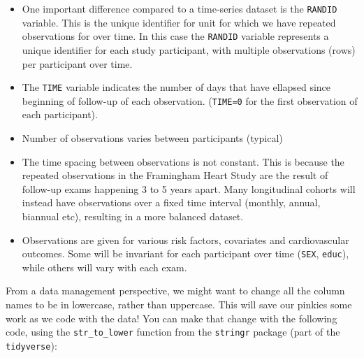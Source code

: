 \documentclass[
]{book}
\newenvironment{Shaded}{\begin{snugshade}}{\end{snugshade}}
\newcommand{\DataTypeTok}[1]{\textcolor[rgb]{0.13,0.29,0.53}{#1}}
\newcommand{\KeywordTok}[1]{\textcolor[rgb]{0.13,0.29,0.53}{\textbf{#1}}}
\newcommand{\NormalTok}[1]{#1}
\newcommand{\OperatorTok}[1]{\textcolor[rgb]{0.81,0.36,0.00}{\textbf{#1}}}
\newcommand{\StringTok}[1]{\textcolor[rgb]{0.31,0.60,0.02}{#1}}
\providecommand{\tightlist}{%
  \setlength{\itemsep}{0pt}\setlength{\parskip}{0pt}}
\begin{document}
\begin{itemize}
\tightlist
\item
  One important difference compared to a time-series dataset is the \texttt{RANDID} variable. This is the unique identifier for unit for which we have repeated observations for over time.
  In this case the \texttt{RANDID} variable represents a unique identifier for each study participant, with multiple observations (rows) per participant over time.
\item
  The \texttt{TIME} variable indicates the number of days that have ellapsed since beginning of follow-up of each observation. (\texttt{TIME=0} for the first observation of each participant).
\item
  Number of observations varies between participants (typical)
\item
  The time spacing between observations is not constant. This is because the repeated observations in the Framingham Heart Study are the result of follow-up exams happening 3 to 5 years apart. Many longitudinal cohorts will instead have observations over a fixed time interval (monthly, annual, biannual etc), resulting in a more balanced dataset.
\item
  Observations are given for various risk factors, covariates and cardiovascular outcomes. Some will be invariant for each participant over time (\texttt{SEX}, \texttt{educ}), while others will vary with each exam.
\end{itemize}

From a data management perspective, we might want to change all the column names
to be in lowercase, rather than uppercase. This will save our pinkies some
work as we code with the data! You can make that change with the following
code, using the \texttt{str\_to\_lower} function from the \texttt{stringr} package (part of
the \texttt{tidyverse}):

\begin{Shaded}
\end{Shaded}
\end{document}
